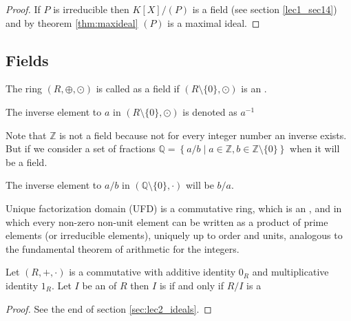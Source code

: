 \begin{appendices}
\begin{theorem}
\begin{proof}
    If $P$ is irreducible then $K\left[X\right]/(P)$ is a field (see
    section \ref{lec1_sec14}) and by theorem \ref{thm:maxideal} $(P)$
    is a maximal ideal.
  \end{proof}
  \label{thm:irreducibleideal}
\end{theorem}

\subsection{Fields}

\begin{definition}[Field]
  The ring $\left(R, \oplus, \odot\right)$ is called as a field if
  $\left(R \setminus \{0\}, \odot\right)$ is an .

  The inverse element to $a$ in
  $\left(R \setminus\{0\}, \odot\right)$ is denoted as $a^{-1}$
  \label{def:field}
\end{definition}

\begin{example}
  Note that $\mathbb{Z}$ is not a field because not for every integer
  number an inverse exists. But if we consider a set of fractions
  $\mathbb{Q} = \left\{a/b \mid a \in \mathbb{Z}, b \in
  \mathbb{Z}\setminus\{0\}\right\}$ when it will be a field.

  The
  inverse element to $a/b$  in
  $\left(\mathbb{Q}\setminus\{0\}, \cdot\right)$  will be $b/a$.
  \label{ex:field}
\end{example}

\begin{definition}
   Unique factorization domain (UFD) is a commutative ring, which is
   an , and in which every non-zero non-unit element
   can be written as a product of prime elements (or irreducible
   elements), uniquely up to order and units, analogous to the
   fundamental theorem of arithmetic for the integers. 
  \label{def:ufd}
\end{definition}

\begin{theorem}
  Let $\left(R, +, \cdot\right)$ is a commutative 
  with additive identity $0_R$ and multiplicative identity $1_R$. Let
  $I$ be an  of $R$ then $I$ is
   if and only if 
  $R/I$ is a 
  \begin{proof}
    See the end of section \ref{sec:lec2_ideals}.
  \end{proof}
  \label{thm:maxideal}
\end{theorem}


\end{appendices}
